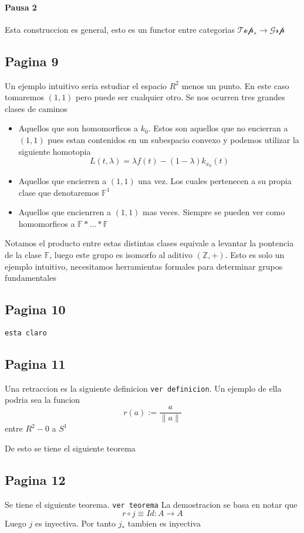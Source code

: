 \documentclass[letterpaper]{article}
\begin{document}
\paragraph{Pausa 2}
Esta construccion es general, esto es un functor entre categorias
\(\mathscr{Top}_* \to \mathscr{Grp}\)

\subsection*{Pagina 9}
Un ejemplo intuitivo seria estudiar el espacio \(R^2\) menos un punto.
En este caso tomaremos \((1,1)\) pero puede ser cualquier otro. Se nos
ocurren tres grandes clases de caminos
\begin{itemize}
\item Aquellos que son homomorficos a \(k_0\). Estos son aquellos que no
  encierran a \((1,1)\) pues estan contenidos en un subespacio convexo y
  podemos utilizar la siguiente homotopia
  \[ L (t,\lambda) = \lambda f (t) - (1 - \lambda) k_{x_0} (t)\]
\item Aquellos que encierren a \((1,1)\) una vez. Los cuales pertenecen
  a su propia clase que denotaremos \(\mathbb F ^1\)
\item Aquellos que encienrren a \((1,1)\) mas veces. Siempre se pueden
  ver como homomorficos a \(\mathbb F * \dots * \mathbb F \)
\end{itemize}
Notamos el producto entre estas distintas clases equivale a levantar la
pontencia de la clase \(\mathbb F\), luego este grupo es isomorfo al
aditivo \((\mathbb Z , +)\). Esto es solo un ejemplo intuitivo,
necesitamos herramientas formales para determinar grupos fundamentales

\subsection*{Pagina 10}
\texttt{esta claro}

\subsection*{Pagina 11}
Una retraccion es la siguiente definicion \texttt{ver definicion}. Un
ejemplo de ella podria sea la funcion
\[ r(a) := \frac a {\lVert a \rVert} \]
entre \(R^2 - 0\) a \(S^1\)

De esto se tiene el siguiente teorema

\subsection*{Pagina 12}
Se tiene el siguiente teorema. \texttt{ver teorema}
La demostracion se basa en notar que
\[ r \circ j \equiv Id : A \to A \]
Luego \(j\) es inyectiva. Por tanto \(j_*\) tambien es inyectiva
\end{document}
